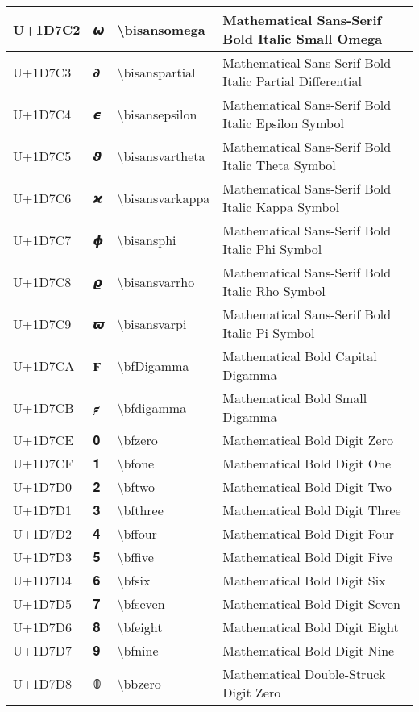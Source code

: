 \begin{table}[h]
\begin{tabulary}{\linewidth}{|L|L|L|L|}
\hline
U+1D7C2 & 𝟂 & {\textbackslash}bisansomega & Mathematical Sans-Serif Bold Italic Small Omega \\
\hline
U+1D7C3 & 𝟃 & {\textbackslash}bisanspartial & Mathematical Sans-Serif Bold Italic Partial Differential \\
\hline
U+1D7C4 & 𝟄 & {\textbackslash}bisansepsilon & Mathematical Sans-Serif Bold Italic Epsilon Symbol \\
\hline
U+1D7C5 & 𝟅 & {\textbackslash}bisansvartheta & Mathematical Sans-Serif Bold Italic Theta Symbol \\
\hline
U+1D7C6 & 𝟆 & {\textbackslash}bisansvarkappa & Mathematical Sans-Serif Bold Italic Kappa Symbol \\
\hline
U+1D7C7 & 𝟇 & {\textbackslash}bisansphi & Mathematical Sans-Serif Bold Italic Phi Symbol \\
\hline
U+1D7C8 & 𝟈 & {\textbackslash}bisansvarrho & Mathematical Sans-Serif Bold Italic Rho Symbol \\
\hline
U+1D7C9 & 𝟉 & {\textbackslash}bisansvarpi & Mathematical Sans-Serif Bold Italic Pi Symbol \\
\hline
U+1D7CA & 𝟊 & {\textbackslash}bfDigamma & Mathematical Bold Capital Digamma \\
\hline
U+1D7CB & 𝟋 & {\textbackslash}bfdigamma & Mathematical Bold Small Digamma \\
\hline
U+1D7CE & 𝟎 & {\textbackslash}bfzero & Mathematical Bold Digit Zero \\
\hline
U+1D7CF & 𝟏 & {\textbackslash}bfone & Mathematical Bold Digit One \\
\hline
U+1D7D0 & 𝟐 & {\textbackslash}bftwo & Mathematical Bold Digit Two \\
\hline
U+1D7D1 & 𝟑 & {\textbackslash}bfthree & Mathematical Bold Digit Three \\
\hline
U+1D7D2 & 𝟒 & {\textbackslash}bffour & Mathematical Bold Digit Four \\
\hline
U+1D7D3 & 𝟓 & {\textbackslash}bffive & Mathematical Bold Digit Five \\
\hline
U+1D7D4 & 𝟔 & {\textbackslash}bfsix & Mathematical Bold Digit Six \\
\hline
U+1D7D5 & 𝟕 & {\textbackslash}bfseven & Mathematical Bold Digit Seven \\
\hline
U+1D7D6 & 𝟖 & {\textbackslash}bfeight & Mathematical Bold Digit Eight \\
\hline
U+1D7D7 & 𝟗 & {\textbackslash}bfnine & Mathematical Bold Digit Nine \\
\hline
U+1D7D8 & 𝟘 & {\textbackslash}bbzero & Mathematical Double-Struck Digit Zero \\

\end{tabulary}
\end{table}

